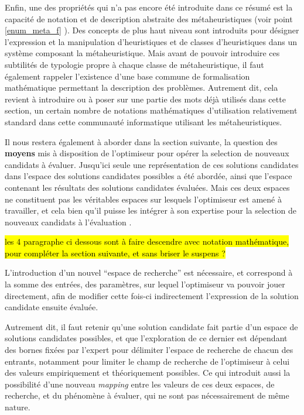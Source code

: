 Enfin, une des propriétés qui n'a pas encore été introduite dans ce résumé est la capacité de notation et de description abstraite des métaheuristiques (voir point \ref{enum_meta_f} ). Des concepts de plus haut niveau sont introduits pour désigner l'expression et la manipulation d'heuristiques et de classes d'heuristiques dans un système composant la métaheuristique. Mais avant de pouvoir introduire ces subtilités de typologie propre à chaque classe de métaheuristique, il faut également rappeler l'existence d'une base commune de formalisation mathématique permettant la description des problèmes. Autrement dit, cela revient à introduire ou à poser sur une partie des mots déjà utilisés dans cette section, un certain nombre de notations mathématiques d'utilisation relativement standard dans cette communauté informatique utilisant les métaheuristiques.

Il nous restera également à aborder dans la section suivante, la question des \textbf{moyens} mis à disposition de l'optimiseur pour opérer la selection de nouveaux candidats à évaluer. Jusqu'ici seule une représentation de ces solutions candidates dans l'espace des solutions candidates possibles a été abordée, ainsi que l'espace contenant les résultats des solutions candidates évaluées. Mais ces deux espaces ne constituent pas les véritables espaces sur lesquels l'optimiseur est amené à travailler, et cela bien qu'il puisse les intégrer à son expertise pour la selection de nouveaux candidats à l'évaluation .

\hl{les 4 paragraphe ci dessous sont à faire descendre avec notation mathématique, pour compléter la section suivante, et sans briser le suspens ?}

L'introduction d'un nouvel \enquote{espace de recherche} est nécessaire, et  correspond à la somme des entrées, des paramètres, sur lequel l'optimiseur va pouvoir jouer directement, afin de modifier cette fois-ci indirectement l'expression de la solution candidate ensuite évaluée.

Autrement dit, il faut retenir qu'une solution candidate fait partie d'un espace de solutions candidates possibles, et que l'exploration de ce dernier est dépendant des bornes fixées par l'expert pour délimiter l'espace de recherche de chacun des entrants, notamment pour limiter le champ de recherche de l'optimiseur à celui des valeurs empiriquement et théoriquement possibles. Ce qui introduit aussi la possibilité d'une nouveau \textit{mapping} entre les valeurs de ces deux espaces, de recherche, et du phénomène à évaluer, qui ne sont pas nécessairement de même nature.

